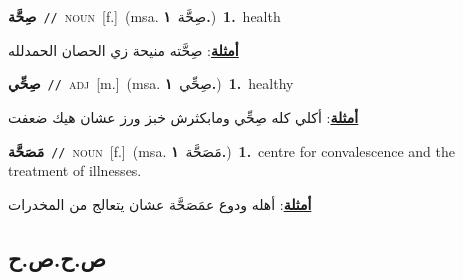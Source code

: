 \documentclass[10pt,a4paper,twoside]{article} %
\begin{document}
\begin{multicols}{2}
{\setlength\topsep{0pt}\textbf{\foreignlanguage{arabic}{صِحَّة}}\ {\color{gray}\texttt{//}\color{black}}\ \textsc{noun}\ [f.]\ \color{gray}(msa. \foreignlanguage{arabic}{صِحَّة}~\foreignlanguage{arabic}{\textbf{١.}})\color{black}\ \textbf{1.}~health\  \begin{flushright}\color{gray}\foreignlanguage{arabic}{\textbf{\underline{\foreignlanguage{arabic}{أمثلة}}}: صِحَّته منيحة زي الحصان الحمدلله}\end{flushright}\color{black}} \vspace{2mm}

{\setlength\topsep{0pt}\textbf{\foreignlanguage{arabic}{صِحِّي}}\ {\color{gray}\texttt{//}\color{black}}\ \textsc{adj}\ [m.]\ \color{gray}(msa. \foreignlanguage{arabic}{صِحِّي}~\foreignlanguage{arabic}{\textbf{١.}})\color{black}\ \textbf{1.}~healthy\  \begin{flushright}\color{gray}\foreignlanguage{arabic}{\textbf{\underline{\foreignlanguage{arabic}{أمثلة}}}: أكلي كله صِحِّي ومابكثرش خبز ورز عشان هيك ضعفت}\end{flushright}\color{black}} \vspace{2mm}

{\setlength\topsep{0pt}\textbf{\foreignlanguage{arabic}{مَصَحَّة}}\ {\color{gray}\texttt{//}\color{black}}\ \textsc{noun}\ [f.]\ \color{gray}(msa. \foreignlanguage{arabic}{مَصَحَّة}~\foreignlanguage{arabic}{\textbf{١.}})\color{black}\ \textbf{1.}~centre for convalescence and the treatment of illnesses.\  \begin{flushright}\color{gray}\foreignlanguage{arabic}{\textbf{\underline{\foreignlanguage{arabic}{أمثلة}}}: أهله ودوع عمَصَحَّة عشان يتعالج من المخدرات}\end{flushright}\color{black}} \vspace{2mm}

\vspace{-3mm}
\subsection*{\color{blue}\foreignlanguage{arabic}{ص.ح.ص.ح}\color{blue}{}} 


\end{multicols}
\end{document}

